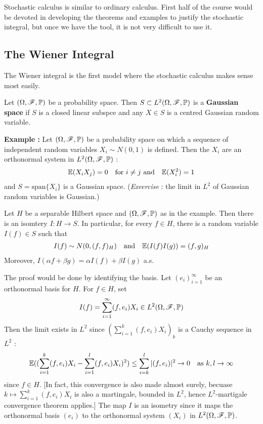 \documentclass[12pt,a4paper]{article}
\newenvironment{proof}
{\begin{changemargin}{0.5cm}{0.5cm} 
	}%
	{\end{changemargin}
}
\newenvironment{p}
{\begin{proof} 
	}%
	{\end{proof}
}
\begin{document}
Stochastic calculus is similar to ordinary calculus. First half of the course would be devoted in developing the theorems and examples to justify the stochastic integral, but once we have the tool, it is not very difficult to use it.

\subsection{The Wiener Integral}

The Wiener integral is the first model where the stochastic calculus makes sense most easily.
\s

 Let $(\Omega, \mathscr{F}, \mathbb{P})$ be a probability space. Then $S\subset L^2(\Omega, \mathscr{F}, \mathbb{P})$ is a \textbf{Gaussian space} if $S$ is a closed linear subspce and any $X\in S$ is a centred Gaussian random variable.
\s

\textbf{Example :} Let $(\Omega, \mathscr{F}, \mathbb{P})$ be a probability space on which a sequence of independent random variables $X_i \sim N(0,1)$ is defined. Then the $X_i$ are an orthonormal system in $L^2(\Omega, \mathscr{F}, \mathbb{P})$ :
\begin{align*}
\mathbb{E}(X_i X_j) =0 \quad \text{for } i\neq j \text{ and} \quad \mathbb{E}(X_i^2) =1 
\end{align*}
and $S= \text{span} \{X_i\}$ is a Gaussian space. (\textit{Exeercise} : the limit in $L^2$ of Gaussian random variables is Gaussian.)
\s

\prop Let $H$ be a separable Hilbert space and $(\Omega, \mathscr{F}, \mathbb{P})$ as in the example. Then there is an isomtery $I: H\rightarrow S$. In particular, for every $f\in H$, there is a random variable $I(f) \in S$ such that
\begin{align*}
I(f) \sim N(0, (f,f)_H) \quad \text{and} \quad \mathbb{E}(I(f)I(g)) = (f,g)_H
\end{align*}
Moreover, $I(\alpha f + \beta g) = \alpha I(f) + \beta I(g)$ a.s.
\begin{p}
\pf The proof would be done by identifying the basis. Let $(e_i)_{i=1}^{\infty}$ be an orthonormal basis for $H$. For $f\in H$, set
\begin{align*}
I(f) = \sum_{i=1}^{\infty} (f,e_i)X_i \in L^2(\Omega, \mathscr{F}, \mathbb{P})
\end{align*}
Then the limit exists in $L^2$ since $(\sum_{i=1}^k (f, e_i)X_i)_k$ is a Cauchy sequence in $L^2$ :
\begin{align*}
\mathbb{E}((\sum_{i=1}^k (f,e_i)X_i - \sum_{i=1}^l (f,e_i)X_i)^2) \leq \sum_{i=k}^l |(f, e_i)|^2 \rightarrow 0 \quad \text{as } k,l\rightarrow \infty
\end{align*}
since $f\in H$. [In fact, this convergence is also made almost surely, becuase $k\mapsto \sum_{i=1}^k (f,e_i)X_i$ is also a martingale, bounded in $L^2$, hence $L^2$-martigale convergence theorem applies.] The map $I$ is an isometry since it maps the orthonormal basis $(e_i)$ to the orthonormal system $(X_i)$ in $L^2(\Omega, \mathscr{F}, \mathbb{P})$.

\eop
\end{p}
\s
\end{document}
